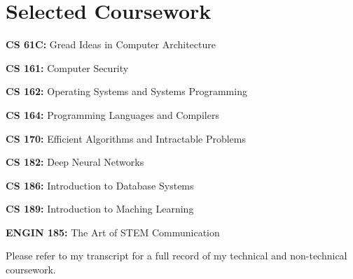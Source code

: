 \documentclass[letterpaper,11pt]{article}
\newcommand{\resumeSubHeadingListStart}{\begin{itemize}[leftmargin=0.15in, label={}]}
\newcommand{\resumeSubHeadingListEnd}{\end{itemize}}
\begin{document}
\section{Selected Coursework}
  \vspace{2pt}
  \resumeSubHeadingListStart
    \small{\item{
        \textbf{CS 61C: }{Gread Ideas in Computer Architecture} \\ \vspace{3pt}

        \textbf{CS 161: }{Computer Security} \\ \vspace{3pt}

        \textbf{CS 162: }{Operating Systems and Systems Programming} \\ \vspace{3pt}
        
        \textbf{CS 164: }{Programming Languages and Compilers} \\ \vspace{3pt}
        
        \textbf{CS 170: }{Efficient Algorithms and Intractable Problems} \\ \vspace{3pt}
        
        \textbf{CS 182: }{Deep Neural Networks} \\ \vspace{3pt}
        
        \textbf{CS 186: }{Introduction to Database Systems} \\ \vspace{3pt}
        
        \textbf{CS 189: }{Introduction to Maching Learning} \\ \vspace{3pt}
        
        \textbf{ENGIN 185: }{The Art of STEM Communication} \\ \vspace{3pt}
        
        Please refer to my transcript for a full record of my technical and non-technical coursework.
    }}
  \resumeSubHeadingListEnd








    



\end{document}
